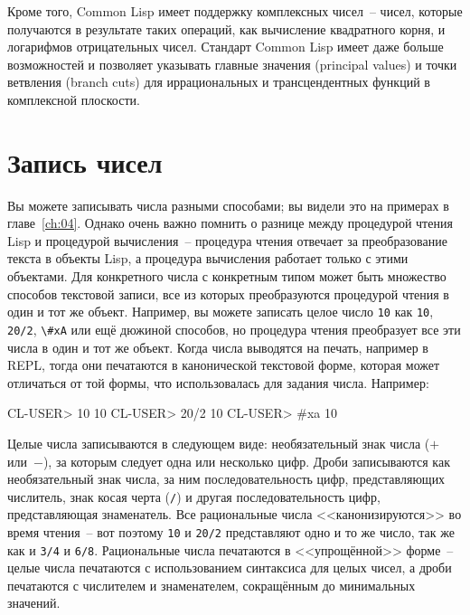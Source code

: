 Кроме того, Common Lisp имеет поддержку комплексных чисел~-- чисел, которые получаются в
результате таких операций, как вычисление квадратного корня, и логарифмов отрицательных
чисел. Стандарт Common Lisp имеет даже больше возможностей и позволяет указывать главные
значения (principal values) и точки ветвления (branch cuts) для иррациональных и
трансцендентных функций в комплексной плоскости.

\section{Запись чисел}

Вы можете записывать числа разными способами; вы видели это на примерах в
главе~\ref{ch:04}.  Однако очень важно помнить о разнице между процедурой чтения Lisp и
процедурой вычисления~-- процедура чтения отвечает за преобразование текста в объекты
Lisp, а процедура вычисления работает только с этими объектами.  Для конкретного числа с
конкретным типом может быть множество способов текстовой записи, все из которых
преобразуются процедурой чтения в один и тот же объект.  Например, вы можете записать
целое число \lstinline{10} как \lstinline{10}, \lstinline{20/2}, \lstinline{\#xA} или ещё дюжиной способов,
но процедура чтения преобразует все эти числа в один и тот же объект.  Когда числа
выводятся на печать, например в REPL, тогда они печатаются в канонической текстовой форме,
которая может отличаться от той формы, что использовалась для задания числа.
Например:

\begin{myverb}
CL-USER> 10
10
CL-USER> 20/2
10
CL-USER> #xa
10
\end{myverb}

Целые числа записываются в следующем виде: необязательный знак числа ($+$ или~$-$), за
которым следует одна или несколько цифр.  Дроби записываются как необязательный знак
числа, за ним последовательность цифр, представляющих числитель, знак косая черта
(\lstinline{/}) и другая последовательность цифр, представляющая знаменатель.  Все
рациональные числа <<канонизируются>> во время чтения~-- вот поэтому \lstinline{10} и \lstinline{20/2}
представляют одно и то же число, так же как и \lstinline{3/4} и \lstinline{6/8}.  Рациональные числа
печатаются в <<упрощённой>> форме~-- целые числа печатаются с использованием синтаксиса для
целых чисел, а дроби печатаются с числителем и знаменателем, сокращённым до минимальных
значений.

